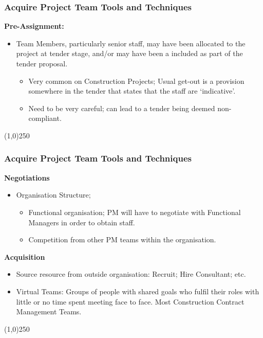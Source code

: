  
\begin{frame}
\frametitle{Acquire Project Team \hfill Tools and Techniques}
\textbf{Pre-Assignment:}
\begin{itemize}
	\item Team Members, particularly senior staff, may have been allocated to the project at tender stage, and/or may have been a included as part of the tender proposal.\\
	\begin{itemize}
		\item Very common on Construction Projects; Usual get-out is a provision somewhere in the tender that states that the staff are `indicative'.  
		\item Need to be very careful; can lead to a tender being deemed non-compliant.
	\end{itemize}
\end{itemize}
\end{frame}\begin{center}\line(1,0){250}\end{center}
 
 
\begin{frame}
\frametitle{Acquire Project Team \hfill Tools and Techniques}
\textbf{Negotiations}
\begin{itemize}
	\item Organisation Structure;
	\begin{itemize}
		\item Functional organisation; PM will have to negotiate with Functional Managers in order to obtain staff.
		\item Competition from other PM teams within the organisation.
	\end{itemize}
\end{itemize}
\textbf{Acquisition}
	\begin{itemize}
		\item Source resource from outside organisation: Recruit; Hire Consultant; etc.
	 	\item Virtual Teams: Groups of people with shared goals who fulfil their roles with little or no time spent meeting face to face. Most Construction Contract Management Teams.
	\end{itemize}
\end{frame}\begin{center}\line(1,0){250}\end{center}
 
